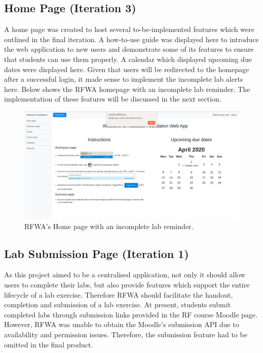 \documentclass{l4proj}
\begin{document}
\subsection{Home Page (Iteration 3)}

A home page was created to host several to-be-implemented features which were outlined in the final iteration. A how-to-use guide was displayed here to introduce the web application to new users and demonstrate some of its features to ensure that students can use them properly. A calendar which displayed upcoming due dates were displayed here. Given that users will be redirected to the homepage after a successful login, it made sense to implement the incomplete lab alerts here. Below shows the RFWA homepage with an incomplete lab reminder. The implementation of these features will be discussed in the next section.

\begin{figure}[h]
    \centering
    \includegraphics[scale=0.2]{images/home_page.png}
    \caption{RFWA's Home page with an incomplete lab reminder.}
    \label{fig:home_page}
\end{figure}

\subsection{Lab Submission Page (Iteration 1)}

As this project aimed to be a centralised application, not only it should allow users to complete their labs, but also provide features which support the entire lifecycle of a lab exercise. Therefore RFWA should facilitate the handout, completion and submission of a lab exercise. At present, students submit completed labs through submission links provided in the RF course Moodle page. However, RFWA was unable to obtain the Moodle's submission API due to availability and permission issues. Therefore, the submission feature had to be omitted in the final product.
\end{document}
